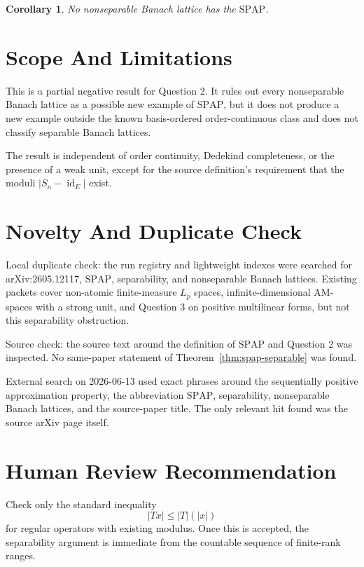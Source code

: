 \documentclass[11pt]{article}
\newtheorem{corollary}{Corollary}
\newcommand{\id}{\operatorname{id}}
\newcommand{\SPAP}{\mathrm{SPAP}}
\begin{document}
\begin{corollary}
No nonseparable Banach lattice has the \(\SPAP\).
\end{corollary}

\section*{Scope And Limitations}

This is a partial negative result for Question 2.  It rules out every
nonseparable Banach lattice as a possible new example of \(\SPAP\), but it
does not produce a new example outside the known basis-ordered
order-continuous class and does not classify separable Banach lattices.

The result is independent of order continuity, Dedekind completeness, or the
presence of a weak unit, except for the source definition's requirement that
the moduli \(|S_n-\id_E|\) exist.

\section*{Novelty And Duplicate Check}

Local duplicate check: the run registry and lightweight indexes were searched
for arXiv:2605.12117, \(\SPAP\), separability, and nonseparable Banach
lattices.  Existing packets cover non-atomic finite-measure \(L_p\) spaces,
infinite-dimensional AM-spaces with a strong unit, and Question 3 on positive
multilinear forms, but not this separability obstruction.

Source check: the source text around the definition of \(\SPAP\) and Question
2 was inspected.  No same-paper statement of Theorem~\ref{thm:spap-separable}
was found.

External search on 2026-06-13 used exact phrases around the sequentially
positive approximation property, the abbreviation \(\SPAP\), separability,
nonseparable Banach lattices, and the source-paper title.  The only relevant
hit found was the source arXiv page itself.

\section*{Human Review Recommendation}

Check only the standard inequality
\[
  |Tx|\leq |T|(|x|)
\]
for regular operators with existing modulus.  Once this is accepted, the
separability argument is immediate from the countable sequence of finite-rank
ranges.
\end{document}
